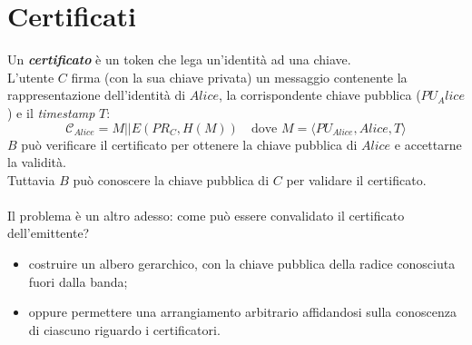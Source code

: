 \documentclass[11pt, a4paper, twoside, italian]{report}
\theoremstyle{plain}
\begin{document}
\section*{Certificati}
Un \textit{\textbf{certificato}} è un token che lega un'identità ad una chiave.\\
L'utente $C$ firma (con la sua chiave privata) un messaggio contenente la rappresentazione dell'identità di $Alice$, la corrispondente chiave pubblica ($PU_Alice$) e il \textit{timestamp} $T$:
$$ \mathcal{C}_{Alice} = M || E(PR_C, H(M)) \text{~~~dove~} M = \langle PU_{Alice}, Alice, T\rangle $$
\noindent
$B$ può verificare il certificato per ottenere la chiave pubblica di $Alice$ e accettarne la validità.\\
Tuttavia $B$ può conoscere la chiave pubblica di $C$ per validare il certificato.\\\\
Il problema è un altro adesso: come può essere convalidato il certificato dell'emittente?
\begin{itemize}
	\item costruire un albero gerarchico, con la chiave pubblica della radice conosciuta fuori dalla banda;
	\item oppure permettere una arrangiamento arbitrario affidandosi sulla conoscenza di ciascuno riguardo i certificatori.
\end{itemize}
\end{document}
